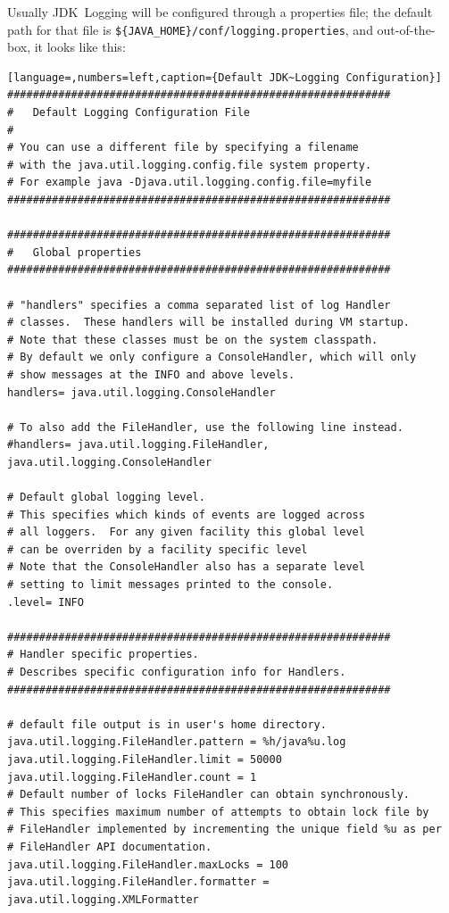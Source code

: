 Usually JDK~Logging will be configured through a properties file; the default path for that file is \verb#${JAVA_HOME}/conf/logging.properties#, and out-of-the-box, it looks like this:
\begin{lstlisting}[language=,numbers=left,caption={Default JDK~Logging Configuration}]
############################################################
#  	Default Logging Configuration File
#
# You can use a different file by specifying a filename
# with the java.util.logging.config.file system property.  
# For example java -Djava.util.logging.config.file=myfile
############################################################

############################################################
#  	Global properties
############################################################

# "handlers" specifies a comma separated list of log Handler 
# classes.  These handlers will be installed during VM startup.
# Note that these classes must be on the system classpath.
# By default we only configure a ConsoleHandler, which will only
# show messages at the INFO and above levels.
handlers= java.util.logging.ConsoleHandler

# To also add the FileHandler, use the following line instead.
#handlers= java.util.logging.FileHandler, java.util.logging.ConsoleHandler

# Default global logging level.
# This specifies which kinds of events are logged across
# all loggers.  For any given facility this global level
# can be overriden by a facility specific level
# Note that the ConsoleHandler also has a separate level
# setting to limit messages printed to the console.
.level= INFO

############################################################
# Handler specific properties.
# Describes specific configuration info for Handlers.
############################################################

# default file output is in user's home directory.
java.util.logging.FileHandler.pattern = %h/java%u.log
java.util.logging.FileHandler.limit = 50000
java.util.logging.FileHandler.count = 1
# Default number of locks FileHandler can obtain synchronously.
# This specifies maximum number of attempts to obtain lock file by 
# FileHandler implemented by incrementing the unique field %u as per 
# FileHandler API documentation.
java.util.logging.FileHandler.maxLocks = 100
java.util.logging.FileHandler.formatter = java.util.logging.XMLFormatter


\end{lstlisting}

